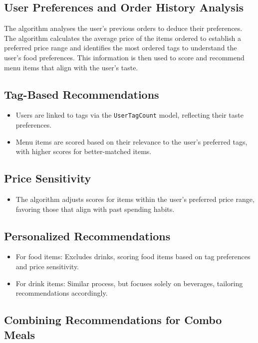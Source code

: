 \subsection{User Preferences and Order History Analysis}
The algorithm analyses the user's previous orders to deduce their preferences. The algorithm calculates the average price of the items ordered to establish a preferred price range and identifies the most ordered tags to understand the user's food preferences. This information is then used to score and recommend menu items that align with the user's taste.

\subsection{Tag-Based Recommendations}

\begin{itemize}
    \item Users are linked to tags via the \texttt{UserTagCount} model, reflecting their taste preferences.
    \item Menu items are scored based on their relevance to the user's preferred tags, with higher scores for better-matched items.
\end{itemize}

\subsection{Price Sensitivity}

\begin{itemize}
    \item The algorithm adjusts scores for items within the user's preferred price range, favoring those that align with past spending habits.
\end{itemize}

\subsection{Personalized Recommendations}

\begin{itemize}
    \item For food items: Excludes drinks, scoring food items based on tag preferences and price sensitivity.
    \item For drink items: Similar process, but focuses solely on beverages, tailoring recommendations accordingly.
\end{itemize}

\subsection{Combining Recommendations for Combo Meals}

